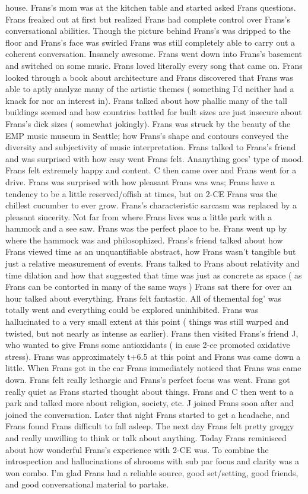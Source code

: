 \documentclass[12pt]{book}
\begin{document}
house. Frans's mom was at the kitchen table and started asked Frans questions. Frans freaked out at first but realized Frans had complete control over Frans's conversational abilities. Though the picture behind Frans's was dripped to the floor and Frans's face was swirled Frans was still completely able to carry out a coherent conversation. Insanely awesome. Frans went down into Frans's basement and switched on some music. Frans loved literally every song that came on. Frans looked through a book about architecture and Frans discovered that Frans was able to aptly analyze many of the artistic themes ( something I'd neither had a knack for nor an interest in). Frans talked about how phallic many of the tall buildings seemed and how countries battled for built sizes are just insecure about Frans's dick sizes ( somewhat jokingly). Frans was struck by the beauty of the EMP music museum in Seattle; how Frans's shape and contours conveyed the diversity and subjectivity of music interpretation. Frans talked to Frans's friend and was surprised with how easy went Frans felt. Ananything goes' type of mood. Frans felt extremely happy and content. C then came over and Frans went for a drive. Frans was surprised with how pleasant Frans was was; Frans have a tendency to be a little reserved/offish at times, but on 2-CE Frans was the chillest cucumber to ever grow. Frans's characteristic sarcasm was replaced by a pleasant sincerity. Not far from where Frans lives was a little park with a hammock and a see saw. Frans was the perfect place to be. Frans went up by where the hammock was and philosophized. Frans's friend talked about how Frans viewed time as an unquantifiable abstract, how Frans wasn't tangible but just a relative measurement of events. Frans talked to Frans about relativity and time dilation and how that suggested that time was just as concrete as space ( as Frans can be contorted in many of the same ways ) Frans sat there for over an hour talked about everything. Frans felt fantastic. All of themental fog' was totally went and everything could be explored uninhibited. Frans was hallucinated to a very small extent at this point ( things was still warped and twisted, but not nearly as intense as earlier). Frans then visited Frans's friend J, who wanted to give Frans some antioxidants ( in case 2-ce promoted oxidative stress). Frans was approximately t+6.5 at this point and Frans was came down a little. When Frans got in the car Frans immediately noticed that Frans was came down. Frans felt really lethargic and Frans's perfect focus was went. Frans got really quiet as Frans started thought about things. Frans and C then went to a park and talked more about religion, society, etc. J joined Frans soon after and joined the conversation. Later that night Frans started to get a headache, and Frans found Frans difficult to fall asleep. The next day Frans felt pretty groggy and really unwilling to think or talk about anything. Today Frans reminisced about how wonderful Frans's experience with 2-CE was. To combine the introspection and hallucinations of shrooms with sub par focus and clarity was a won combo. I'm glad Frans had a reliable source, good set/setting, good friends, and good conversational material to partake.
\end{document}
